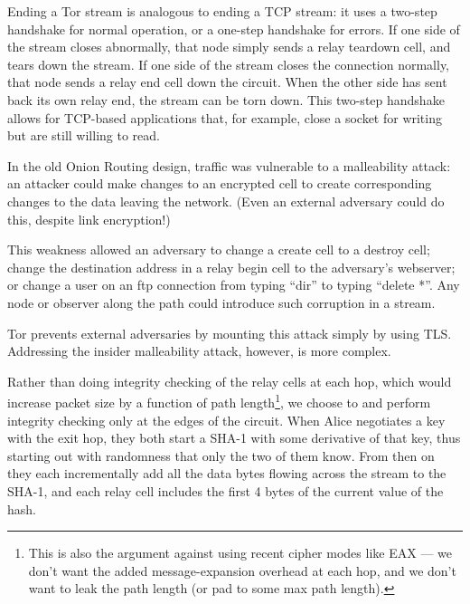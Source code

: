 \documentclass[times,10pt,twocolumn]{article}
\begin{document}
Ending a Tor stream is analogous to ending a TCP stream: it uses a
two-step handshake for normal operation, or a one-step handshake for
errors. If one side of the stream closes abnormally, that node simply
sends a relay teardown cell, and tears down the stream. If one side
of the stream closes the connection normally, that node sends a relay
end cell down the circuit. When the other side has sent back its own
relay end, the stream can be torn down. This two-step handshake allows
for TCP-based applications that, for example, close a socket for writing
but are still willing to read.


In the old Onion Routing design, traffic was vulnerable to a
malleability attack: an attacker could make changes to an encrypted
cell to create corresponding changes to the data leaving the network.
(Even an external adversary could do this, despite link encryption!)

This weakness allowed an adversary to change a create cell to a destroy
cell; change the destination address in a relay begin cell to the
adversary's webserver; or change a user on an ftp connection from
typing ``dir'' to typing ``delete *''. Any node or observer along the
path could introduce such corruption in a stream.

Tor prevents external adversaries by mounting this attack simply by
using TLS. Addressing the insider malleability attack, however, is
more complex.

Rather than doing integrity checking of the relay cells at each hop,
which would increase packet size
by a function of path length\footnote{This is also the argument against
using recent cipher modes like EAX \cite{eax} --- we don't want the added
message-expansion overhead at each hop, and we don't want to leak the path
length (or pad to some max path length).}, we choose to
and perform integrity
checking only at the edges of the circuit. When Alice negotiates a key
with the exit hop, they both start a SHA-1 with some derivative of that key,
thus starting out with randomness that only the two of them know. From
then on they each incrementally add all the data bytes flowing across
the stream to the SHA-1, and each relay cell includes the first 4 bytes
of the current value of the hash. 
\end{document}
